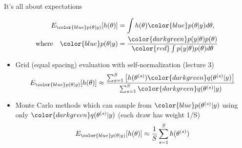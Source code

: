 \documentclass[english,t]{beamer}
\begin{document}
\begin{frame}

  {\Large\color{navyblue} It's all about expectations}

  \vspace{-1.5\baselineskip}
   \begin{align*}
     E_{\color{blue} p(\theta|y)}[h(\theta)] & = \int h(\theta) {\color{blue} p(\theta|y)} d\theta,\\
     \text{where} \quad
     {\color{blue} p(\theta|y)} & = \frac{\color{darkgreen}p(y|\theta)p(\theta)}{\color{red} \int p(y|\theta)p(\theta) d\theta}
   \end{align*}

 \begin{itemize}
   \vspace{-0.5\baselineskip}
    \item<4-> Grid (equal spacing) evaluation with self-normalization {\small(lecture 3)}
      \begin{align*}
        E_{\color{blue} p(\theta|y)}[h(\theta)] \approx
        \frac{\sum_{s=1}^S \left[h(\theta^{(s)}){\color{darkgreen}q(\theta^{(s)}|y)}\right]}{\sum_{s=1}^S{\color{darkgreen}q(\theta^{(s)}|y)}}
      \end{align*}
    \item<5-> Monte Carlo methods which can sample from
      ${\color{blue}p(\theta^{(s)}|y)}$ using only
      ${\color{darkgreen}q(\theta^{(s)}|y)}$ {\color{gray}(each draw has weight 1/S)}
         \vspace{-0.5\baselineskip}
      \begin{align*}
        E_{\color{blue} p(\theta|y)}[h(\theta)] \approx \frac{1}{S} \sum_{s=1}^S h(\theta^{(s)})
      \end{align*}
    \end{itemize}
   
\end{frame}
\end{document}

